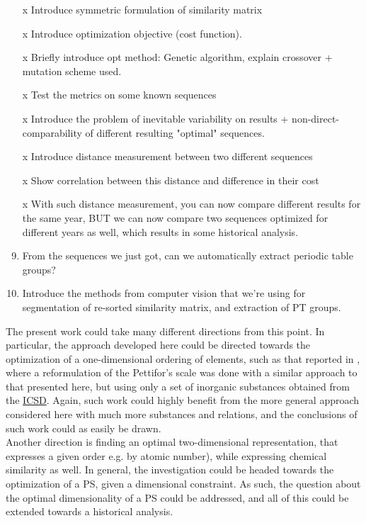 \documentclass[article]{article}
\begin{document}
\begin{enumerate}
	\item [x] Introduce symmetric formulation of similarity matrix
	\item [x] Introduce optimization objective (cost function).
	\item [x] Briefly introduce opt method: Genetic algorithm, explain crossover + mutation scheme used.
	\item [x] Test the metrics on some known sequences
	\item [x] Introduce the problem of inevitable variability on results + non-direct-comparability of different resulting "optimal" sequences.
	\item [x] Introduce distance measurement between two different sequences
	\item [x] Show correlation between this distance and difference in their cost
	\item [x] With such distance measurement, you can now compare different results for the same year, BUT we can now compare two sequences optimized for different years as well, which results in some historical analysis.
	\item From the sequences we just got, can we automatically extract periodic table groups?
	\item Introduce the methods from computer vision that we're using for segmentation of re-sorted similarity matrix, and extraction of PT groups.
	
	
\end{enumerate}

The present work could take many different directions from this point. In particular, the approach developed here could be directed towards the optimization of a one-dimensional ordering of elements, such as that reported in \cite{Glawe_2016}, where a reformulation of the Pettifor's scale was done with a similar approach to that presented here, but using only a set of inorganic substances obtained from the \href{https://ucsd.libguides.com/crystallography/icsd}{ICSD}. Again, such work could highly benefit from the more general approach considered here with much more substances and relations, and the conclusions of such work could as easily be drawn.\\


Another direction is finding an optimal two-dimensional representation, that expresses a given order e.g. by atomic number), while expressing chemical similarity as well. In general, the investigation could be headed towards the optimization of a PS, given a dimensional constraint. As such, the question about the optimal dimensionality of a PS could be addressed, and all of this could be extended towards a historical analysis.\\
\end{document}
